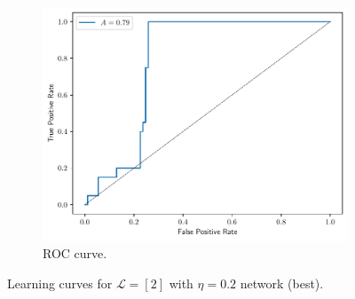 \documentclass[conference]{IEEEtran}
\theoremstyle{definition}
\theoremstyle{remark}
\theoremstyle{remark}
\begin{document}
\begin{figure}
\begin{subfigure}[b]{0.32\textwidth}
        \includegraphics[width=\textwidth]{figs/2-0.2-emb-roc.pdf}
        \caption{ROC curve.}
    \end{subfigure}
    \caption{Learning curves for $\mathcal{L}=[2]$ with $\eta=0.2$ network
    (best).}
\end{figure}
\end{document}
